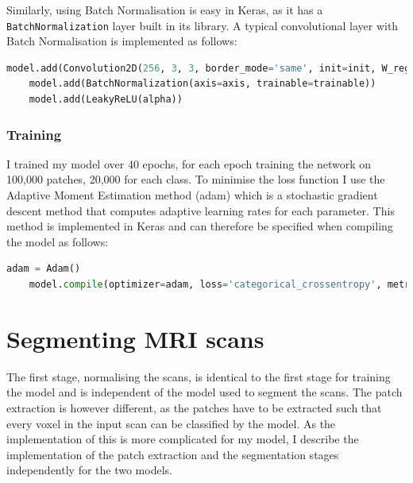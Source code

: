 \documentclass[12pt,a4paper,twoside,openright]{report}
\begin{document}
Similarly, using Batch Normalisation is easy in Keras, as it has a \texttt{BatchNormalization} layer built in its library. A typical convolutional layer with Batch Normalisation is implemented as follows:
\begin{lstlisting}[language=Python]
	model.add(Convolution2D(256, 3, 3, border_mode='same', init=init, W_regularizer=l2(l)))
	model.add(BatchNormalization(axis=axis, trainable=trainable))
	model.add(LeakyReLU(alpha))
\end{lstlisting}

\subsubsection{Training}
I trained my model over 40 epochs, for each epoch training the network on 100,000 patches, 20,000 for each class. To minimise the loss function I use the Adaptive Moment Estimation method (adam) \cite{adam} which is a stochastic gradient descent method that computes adaptive learning rates for each parameter. This method is implemented in Keras and can therefore be specified when compiling the model as follows:
\begin{lstlisting}[language=Python]
	adam = Adam()
    model.compile(optimizer=adam, loss='categorical_crossentropy', metrics=['accuracy'])
\end{lstlisting}

\section{Segmenting MRI scans}
The first stage, normalising the scans, is identical to the first stage for training the model and is independent of the model used to segment the scans. The patch extraction is however different, as the patches have to be extracted such that every voxel in the input scan can be classified by the model. As the implementation of this is more complicated for my model, I describe the implementation of the patch extraction and the segmentation stages independently for the two models.
\end{document}
